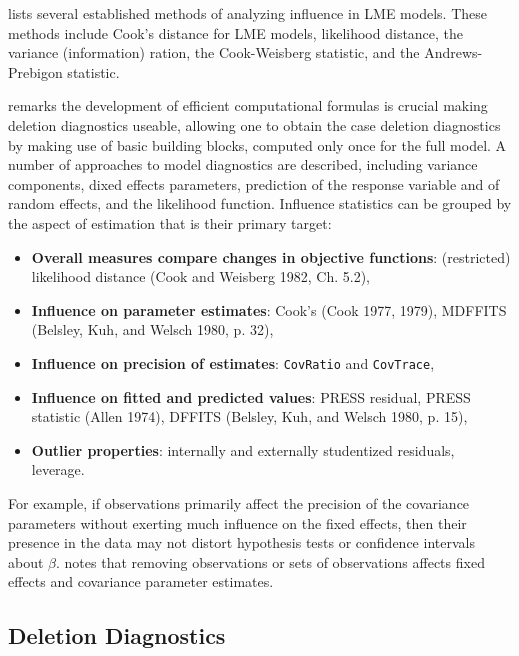\documentclass[12pt, a4paper]{report}
\theoremstyle{definition}
\theoremstyle{remark}
\begin{document}
\citet{Zewotir} lists several established methods of analyzing influence in LME models. These methods include Cook's distance for LME models,
 likelihood distance,
the variance (information) ration,
the  Cook-Weisberg statistic, and
the  Andrews-Prebigon statistic.



\citet{Zewotir} remarks the development of efficient computational formulas is crucial making deletion diagnostics useable, allowing one to obtain the  case deletion diagnostics by making use of basic building blocks, computed only once for the full model. A number of approaches to model diagnostics are described, including variance components, dixed effects parameters, prediction of the response variable and of random effects, and the likelihood function. Influence statistics can be grouped by the aspect of estimation that is their primary target:
\begin{itemize}
\item \textbf{Overall measures compare changes in objective functions}: (restricted) likelihood distance (Cook and Weisberg 1982, Ch. 5.2),
\item \textbf{Influence on parameter estimates}: Cook's  (Cook 1977, 1979), MDFFITS (Belsley, Kuh, and Welsch 1980, p. 32),
\item \textbf{Influence on precision of estimates}: \texttt{CovRatio} and \texttt{CovTrace},
\item \textbf{Influence on fitted and predicted values}: PRESS residual, PRESS statistic (Allen 1974), DFFITS (Belsley, Kuh, and Welsch 1980, p. 15),
\item \textbf{Outlier properties}: internally and externally studentized residuals, leverage.
\end{itemize}




For example, if observations primarily affect the precision of the covariance parameters without exerting much influence on the fixed effects, then their presence in the data may not distort hypothesis
tests or confidence intervals about $\beta$. 
\citet{schabenberger} notes that removing observations or sets of observations affects fixed effects and covariance parameter estimates.





\subsection{Deletion Diagnostics}
\end{document}
